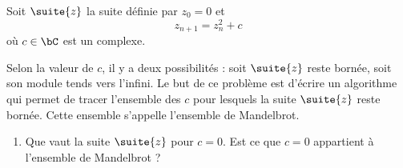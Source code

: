 



\begin{exercice}
Soit $\suite{z}$ la suite définie par $z_0=0$ et 
$$z_{n+1} =z_n^2 +c$$
où $c\in \bC$ est un complexe. 

Selon la valeur de $c$, il y a deux possibilités : soit $\suite{z}$ reste bornée, soit son module tends vers l'infini. Le but de ce problème est d'écrire un algorithme qui permet de tracer l'ensemble des $c$ pour lesquels la suite $\suite{z}$ reste bornée. Cette ensemble s'appelle l'ensemble de Mandelbrot. 
\begin{enumerate}
\item Que vaut la suite $\suite{z}$ pour $c=0$. Est ce que $c=0$ appartient à l'ensemble de Mandelbrot ?


\end{enumerate}
\end{exercice}
